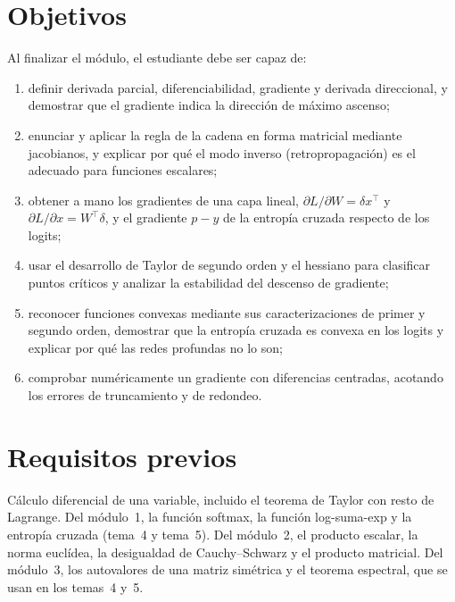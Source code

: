 \documentclass[11pt,a4paper,twoside,openany]{book}
\newcommand{\T}{^{\top}}
\begin{document}
\section*{Objetivos}
Al finalizar el módulo, el estudiante debe ser capaz de:
\begin{enumerate}[label=\arabic*.]
  \item definir derivada parcial, diferenciabilidad, gradiente y derivada direccional, y demostrar que el gradiente indica la dirección de máximo ascenso;
  \item enunciar y aplicar la regla de la cadena en forma matricial mediante jacobianos, y explicar por qué el modo inverso (retropropagación) es el adecuado para funciones escalares;
  \item obtener a mano los gradientes de una capa lineal, $\partial L/\partial W=\delta x\T$ y $\partial L/\partial x=W\T\delta$, y el gradiente $p-y$ de la entropía cruzada respecto de los logits;
  \item usar el desarrollo de Taylor de segundo orden y el hessiano para clasificar puntos críticos y analizar la estabilidad del descenso de gradiente;
  \item reconocer funciones convexas mediante sus caracterizaciones de primer y segundo orden, demostrar que la entropía cruzada es convexa en los logits y explicar por qué las redes profundas no lo son;
  \item comprobar numéricamente un gradiente con diferencias centradas, acotando los errores de truncamiento y de redondeo.
\end{enumerate}

\section*{Requisitos previos}
Cálculo diferencial de una variable, incluido el teorema de Taylor con resto de Lagrange. Del módulo~1, la función softmax, la función log-suma-exp y la entropía cruzada (tema~4 y tema~5). Del módulo~2, el producto escalar, la norma euclídea, la desigualdad de Cauchy--Schwarz y el producto matricial. Del módulo~3, los autovalores de una matriz simétrica y el teorema espectral, que se usan en los temas~4 y~5.
\end{document}
